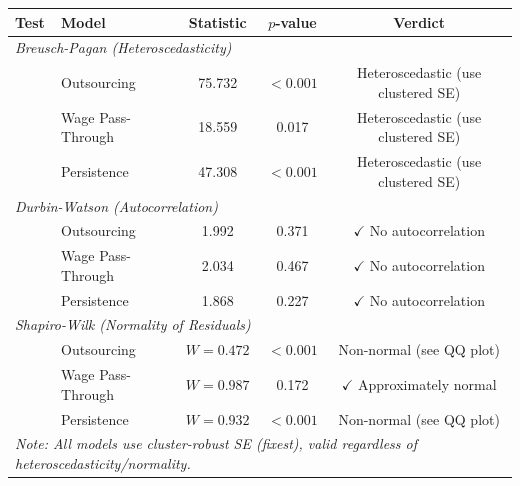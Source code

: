 \documentclass[11pt]{article}
\begin{document}
	\begin{center}
		\begin{tabular}{llccc}
			\toprule
			Test & Model & Statistic & $p$-value & Verdict \\
			\midrule
			\multicolumn{5}{l}{\textit{Breusch-Pagan (Heteroscedasticity)}} \\
			& Outsourcing & 75.732 & $<0.001$ & Heteroscedastic (use clustered SE) \\
			& Wage Pass-Through & 18.559 & 0.017 & Heteroscedastic (use clustered SE) \\
			& Persistence & 47.308 & $<0.001$ & Heteroscedastic (use clustered SE) \\
			\midrule
			\multicolumn{5}{l}{\textit{Durbin-Watson (Autocorrelation)}} \\
			& Outsourcing & 1.992 & 0.371 & $\checkmark$ No autocorrelation \\
			& Wage Pass-Through & 2.034 & 0.467 & $\checkmark$ No autocorrelation \\
			& Persistence & 1.868 & 0.227 & $\checkmark$ No autocorrelation \\
			\midrule
			\multicolumn{5}{l}{\textit{Shapiro-Wilk (Normality of Residuals)}} \\
			& Outsourcing & $W=0.472$ & $<0.001$ & Non-normal (see QQ plot) \\
			& Wage Pass-Through & $W=0.987$ & 0.172 & $\checkmark$ Approximately normal \\
			& Persistence & $W=0.932$ & $<0.001$ & Non-normal (see QQ plot) \\
			\midrule
			\multicolumn{5}{l}{\textit{Note: All models use cluster-robust SE (fixest), valid regardless of heteroscedasticity/normality.}} \\
			\bottomrule
		\end{tabular}
	\end{center}
	
\end{document}
